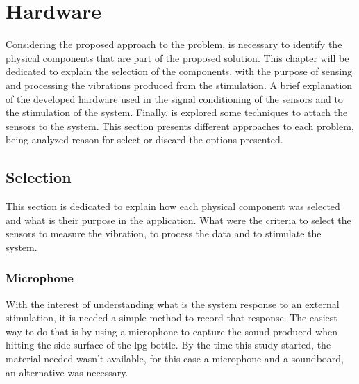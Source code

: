 \cleardoublepage
\chapter{Hardware}\label{p}



Considering the proposed approach to the problem, is necessary to identify the physical components that are part of the proposed solution. This chapter will be dedicated to explain the selection of the components, with the purpose of sensing and processing the vibrations produced from the stimulation. A brief explanation of the developed hardware used in the signal conditioning of the sensors and to the stimulation of the system. Finally, is explored some techniques to attach the sensors to the system. This section presents different approaches to each problem, being analyzed reason for select or discard the options presented.  
\section{Selection}
This section is dedicated to explain how each physical component was selected and what is their purpose in the application. What were the criteria to select the sensors to measure the vibration,  to process the data and to stimulate the system. 
\subsection{Microphone}
With the interest of understanding what is the system response to an external stimulation, it is needed a simple method to record that response. The easiest way to do that is by using a microphone to capture the sound produced when hitting the side surface of the \acrshort{lpg} bottle. By the time this study started, the material needed wasn't available, for this case a microphone and a soundboard, an alternative was necessary.

